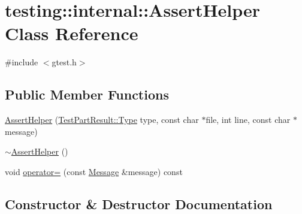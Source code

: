 \hypertarget{classtesting_1_1internal_1_1_assert_helper}{}\section{testing\+:\+:internal\+:\+:Assert\+Helper Class Reference}
\label{classtesting_1_1internal_1_1_assert_helper}


{\ttfamily \#include $<$gtest.\+h$>$}

\subsection*{Public Member Functions}
\begin{DoxyCompactItemize}
\item 
\hyperlink{classtesting_1_1internal_1_1_assert_helper_ac2c9334518fd4087189b4505567a3c90}{Assert\+Helper} (\hyperlink{classtesting_1_1_test_part_result_a65ae656b33fdfdfffaf34858778a52d5}{Test\+Part\+Result\+::\+Type} type, const char $\ast$file, int line, const char $\ast$message)
\item 
\hyperlink{classtesting_1_1internal_1_1_assert_helper_a51c640785d4ed4a0155cc9aa857d8931}{$\sim$\+Assert\+Helper} ()
\item 
void \hyperlink{classtesting_1_1internal_1_1_assert_helper_ab721be11cb9aca8a361ca1f014ca5f80}{operator=} (const \hyperlink{classtesting_1_1_message}{Message} \&message) const 
\end{DoxyCompactItemize}


\subsection{Constructor \& Destructor Documentation}
\hypertarget{classtesting_1_1internal_1_1_assert_helper_ac2c9334518fd4087189b4505567a3c90}{}
